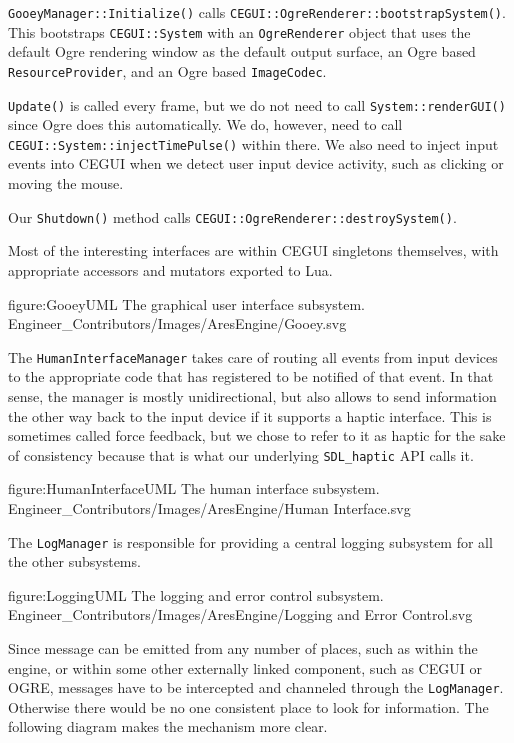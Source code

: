 {\tt GooeyManager::Initialize()} calls {\tt CEGUI::OgreRenderer::bootstrapSystem()}. This bootstraps {\tt CEGUI::System} with an {\tt OgreRenderer} object that uses the default Ogre rendering window as the default output surface, an Ogre based {\tt ResourceProvider}, and an Ogre based {\tt ImageCodec}.

{\tt Update()} is called every frame, but we do not need to call {\tt System::renderGUI()} since Ogre does this automatically. We do, however, need to call {\tt CEGUI::System::injectTimePulse()} within there. We also need to inject input events into CEGUI when we detect user input device activity, such as clicking or moving the mouse.

Our {\tt Shutdown()} method calls {\tt CEGUI::OgreRenderer::destroySystem()}.

Most of the interesting interfaces are within CEGUI singletons themselves, with appropriate accessors and mutators exported to Lua.

\FullPageDiagram
    {figure:GooeyUML}
    {The graphical user interface subsystem.}
    {Engineer_Contributors/Images/AresEngine/Gooey.svg}

\page 
{}
The {\tt HumanInterfaceManager} takes care of routing all events from input devices to the appropriate code that has registered to be notified of that event. In that sense, the manager is mostly unidirectional, but also allows to send information the other way back to the input device if it supports a haptic interface. This is sometimes called force feedback, but we chose to refer to it as haptic for the sake of consistency because that is what our underlying {\tt SDL_haptic} API calls it.

\FullPageDiagram
    {figure:HumanInterfaceUML}
    {The human interface subsystem.}
    {Engineer_Contributors/Images/AresEngine/Human Interface.svg}

\page 
{}
The {\tt LogManager} is responsible for providing a central logging subsystem for all the other subsystems.

\FullPageDiagram
    {figure:LoggingUML}
    {The logging and error control subsystem.}
    {Engineer_Contributors/Images/AresEngine/Logging and Error Control.svg}
    
Since message can be emitted from any number of places, such as within the engine, or within some other externally linked component, such as CEGUI or OGRE, messages have to be intercepted and channeled through the {\tt LogManager}. Otherwise there would be no one consistent place to look for information. The following diagram makes the mechanism more clear.

